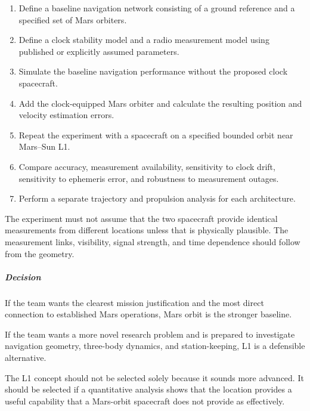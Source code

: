 \begin{enumerate}
	\item Define a baseline navigation network consisting of
	      a ground reference and a specified set of Mars orbiters.

	\item Define a clock stability model and a radio measurement
	      model using published or explicitly assumed parameters.

	\item Simulate the baseline navigation performance without
	      the proposed clock spacecraft.

	\item Add the clock-equipped Mars orbiter and calculate the
	      resulting position and velocity estimation errors.

	\item Repeat the experiment with a spacecraft on a specified
	      bounded orbit near Mars--Sun L1.

	\item Compare accuracy, measurement availability, sensitivity
	      to clock drift, sensitivity to ephemeris error, and robustness
	      to measurement outages.

	\item Perform a separate trajectory and propulsion analysis
	      for each architecture.
\end{enumerate}

The experiment must not assume that the two spacecraft provide
identical measurements from different locations unless that is
physically plausible. The measurement links, visibility, signal
strength, and time dependence should follow from the geometry.

\subparagraph{Decision}

If the team wants the clearest mission justification and the
most direct connection to established Mars operations, Mars
orbit is the stronger baseline.

If the team wants a more novel research problem and is prepared
to investigate navigation geometry, three-body dynamics, and
station-keeping, L1 is a defensible alternative.

The L1 concept should not be selected solely because it sounds
more advanced. It should be selected if a quantitative analysis
shows that the location provides a useful capability that a
Mars-orbit spacecraft does not provide as effectively.

